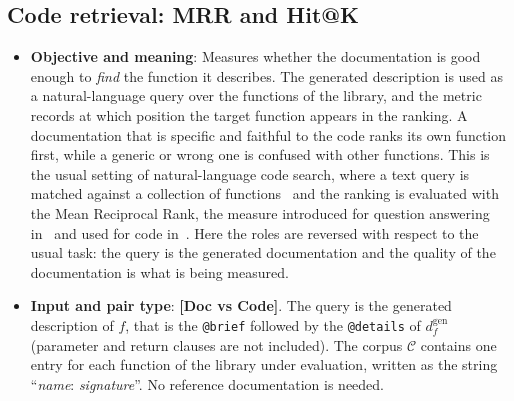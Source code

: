 \subsection{Code retrieval: MRR and Hit@K}
\label{sec:m-retrieval}
\begin{itemize}[leftmargin=*, label=\textbullet]
	\item \textbf{Objective and meaning}: Measures whether the documentation is good enough to
	\emph{find} the function it describes. The generated description is used as a natural-language
	query over the functions of the library, and the metric records at which position the target
	function appears in the ranking. A documentation that is specific and faithful to the code
	ranks its own function first, while a generic or wrong one is confused with other functions.
	This is the usual setting of natural-language code search, where a text query is matched
	against a collection of functions~\cite{husain_codesearchnet_2019,feng_codebert_2020,guo_graphcodebert_2021}
	and the ranking is evaluated with the Mean Reciprocal Rank, the measure introduced for
	question answering in~\cite{voorhees_trec8_1999} and used for code in~\cite{iyer_summarizing_2016}.
	Here the roles are reversed with respect to the usual task: the query is the generated
	documentation and the quality of the documentation is what is being measured.

	\item \textbf{Input and pair type}: \textbf{[Doc vs Code]}. The query is the generated
	description of $f$, that is the \texttt{@brief} followed by the \texttt{@details} of
	$d_f^{\mathrm{gen}}$ (parameter and return clauses are not included). The corpus
	$\mathcal{C}$ contains one entry for each function of the library under evaluation, written as
	the string ``\emph{name}: \emph{signature}''. No reference documentation is needed.


\end{itemize}
